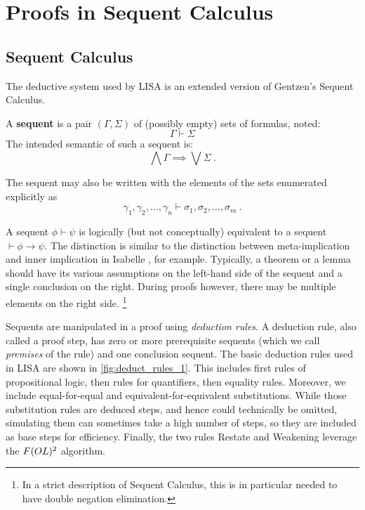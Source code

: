 \section{Proofs in Sequent Calculus}
\label{sect:proofs_lk}
\subsection{Sequent Calculus}
\label{subsec:lk}
The deductive system used by LISA is an extended version of Gentzen's Sequent Calculus.
\begin{defin}
  A \textbf{sequent} is a pair $(\Gamma, \Sigma)$ of (possibly empty) sets of formulas, noted:
  $$\Gamma \vdash \Sigma$$
  The intended semantic of such a sequent is:
  \begin{equation*}
    \label{eq:SequentSemantic}
    \bigwedge \Gamma \implies \bigvee \Sigma~.
  \end{equation*}

  The sequent may also be written with the elements of the sets enumerated explicitly as
  \begin{equation*}
    \gamma_1, \gamma_2, \ldots, \gamma_n \vdash \sigma_1, \sigma_2, \ldots, \sigma_m~.
  \end{equation*}
\end{defin}
A sequent $\phi \vdash \psi$ is logically (but not conceptually) equivalent to a sequent $\vdash \phi \rightarrow \psi$. The distinction is similar to the distinction between meta-implication and inner implication in Isabelle \cite{paulsonIsabelleNext7001993}, for example. Typically, a theorem or a lemma should have its various assumptions on the left-hand side of the sequent and a single conclusion on the right. During proofs however, there may be multiple elements on the right side. \footnote{In a strict description of Sequent Calculus, this is in particular needed to have double negation elimination.}

Sequents are manipulated in a proof using \emph{deduction rules}. A deduction rule, also called a proof step, has zero or more prerequisite sequents (which we call \emph{premises} of the rule) and one conclusion sequent. The basic deduction rules used in LISA are shown in \autoref{fig:deduct_rules_1}.
This includes first rules of propositional logic, then rules for quantifiers, then equality rules. Moreover, we include equal-for-equal and equivalent-for-equivalent substitutions. While those substitution rules are deduced steps, and hence could technically be omitted, simulating them can sometimes take a high number of steps, so they are included as base steps for efficiency.
Finally, the two rules Restate and Weakening leverage the $F(OL)\textsuperscript{2}$ algorithm.

